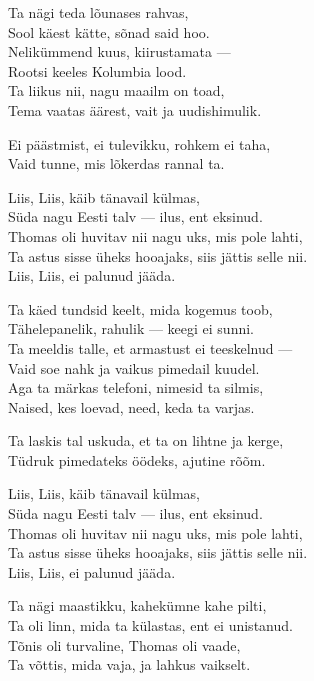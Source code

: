 \begin{lyrics}
Ta nägi teda lõunases rahvas,\\
Sool käest kätte, sõnad said hoo.\\
Nelikümmend kuus, kiirustamata —\\
Rootsi keeles Kolumbia lood.\\
Ta liikus nii, nagu maailm on toad,\\
Tema vaatas äärest, vait ja uudishimulik.

Ei päästmist, ei tulevikku, rohkem ei taha,\\
Vaid tunne, mis lõkerdas rannal ta.

Liis, Liis, käib tänavail külmas,\\
Süda nagu Eesti talv — ilus, ent eksinud.\\
Thomas oli huvitav nii nagu uks, mis pole lahti,\\
Ta astus sisse üheks hooajaks, siis jättis selle nii.\\
Liis, Liis, ei palunud jääda.

Ta käed tundsid keelt, mida kogemus toob,\\
Tähelepanelik, rahulik — keegi ei sunni.\\
Ta meeldis talle, et armastust ei teeskelnud —\\
Vaid soe nahk ja vaikus pimedail kuudel.\\
Aga ta märkas telefoni, nimesid ta silmis,\\
Naised, kes loevad, need, keda ta varjas.

Ta laskis tal uskuda, et ta on lihtne ja kerge,\\
Tüdruk pimedateks öödeks, ajutine rõõm.

Liis, Liis, käib tänavail külmas,\\
Süda nagu Eesti talv — ilus, ent eksinud.\\
Thomas oli huvitav nii nagu uks, mis pole lahti,\\
Ta astus sisse üheks hooajaks, siis jättis selle nii.\\
Liis, Liis, ei palunud jääda.

Ta nägi maastikku, kahekümne kahe pilti,\\
Ta oli linn, mida ta külastas, ent ei unistanud.\\
Tõnis oli turvaline, Thomas oli vaade,\\
Ta võttis, mida vaja, ja lahkus vaikselt.


\end{lyrics}
